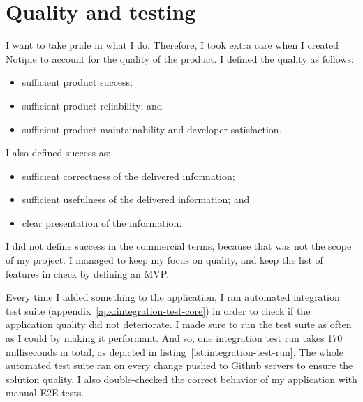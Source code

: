 \section{Quality and testing}\label{sec:quality}

I want to take pride in what I do.
Therefore,
I took extra care when I created Notipie
to account for the quality of the product.
I defined the quality as follows:

\begin{itemize}
  \item sufficient product success;
  \item sufficient product reliability; and
  \item sufficient product maintainability and developer satisfaction.
\end{itemize}

I also defined success as:

\begin{itemize}
  \item sufficient correctness of the delivered information;
  \item sufficient usefulness of the delivered information; and
  \item clear presentation of the information.
\end{itemize}

I did not define success in the commercial terms,
because that was not the scope of my project.
I managed to keep my focus on quality,
and keep the list of features in check
by defining an \ac{MVP}.

Every time I added something to the application,
I ran automated integration test suite
(appendix~\ref{apx:integration-test-core})
in order to check if the application quality
did not deteriorate.
I made sure to run the test suite as often as I could
by making it performant.
And so, one integration test run takes 170 milliseconds in total,
as depicted in listing~\ref{lst:integration-test-run}.
The whole automated test suite ran on every change
pushed to Github servers to ensure the solution quality.
I also double-checked the correct behavior
of my application with manual \ac{E2E} tests.




